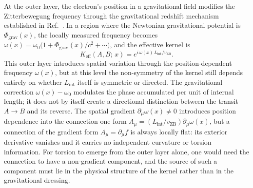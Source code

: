 \documentclass[%
 reprint,
 amsmath,amssymb,
 aps,
 prb,
]{revtex4-2}
\numberwithin{equation}{section}
\newcommand{\Lint}{L_{\text{int}}}
\newcommand{\vZB}{v_{\text{ZB}}}
\newcommand{\omeff}{\omega(x)}
\begin{document}
At the outer layer, the electron's position in a gravitational field modifies the Zitterbewegung frequency through the gravitational redshift mechanism established in Ref.~\cite{paper22}. In a region where the Newtonian gravitational potential is $\Phi_{\text{grav}}(x)$, the locally measured frequency becomes $\omega(x) = \omega_0\bigl(1 + \Phi_{\text{grav}}(x)/c^2 + \cdots\bigr)$, and the effective kernel is
\begin{equation}
K_{\text{eff}}(A,B;\,x) = e^{i\,\omeff\,\Lint/\vZB}.
\label{eq:kernel_eff}
\end{equation}
This outer layer introduces spatial variation through the position-dependent frequency $\omeff$, but at this level the non-symmetry of the kernel still depends entirely on whether $\Lint$ itself is symmetric or directed. The gravitational correction $\omega(x) - \omega_0$ modulates the phase accumulated per unit of internal length; it does not by itself create a directional distinction between the transit $A\to B$ and its reverse. The spatial gradient $\partial_\mu\omeff \neq 0$ introduces position dependence into the connection one-form $A_\mu = (\Lint/\vZB)\partial_\mu\omeff$, but a connection of the gradient form $A_\mu = \partial_\mu f$ is always locally flat: its exterior derivative vanishes and it carries no independent curvature or torsion information. For torsion to emerge from the outer layer alone, one would need the connection to have a non-gradient component, and the source of such a component must lie in the physical structure of the kernel rather than in the gravitational dressing.
\end{document}
